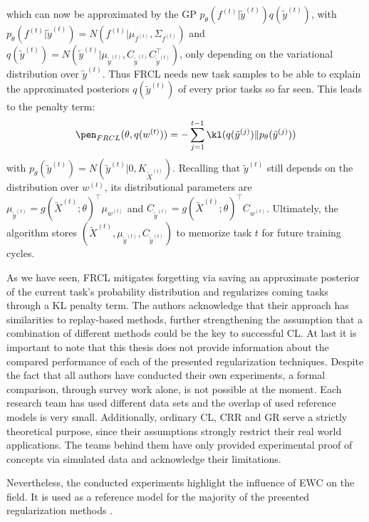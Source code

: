which can now be approximated by the GP $p_\theta(f^{(t)}| \tilde{y}^{(t)})q(\tilde{y}^{(t)})$, with $p_\theta(f^{(t)}|\tilde{y}^{(t)}) = N(f^{(t)}|\mu_{f^{(t)}},\allowbreak \Sigma_{f^{(t)}})$ and $q(\tilde{y}^{(t)}) = N(\tilde{y}^{(t)}|\mu_{\tilde{y}^{(t)}}, C_{\tilde{y}^{(t)}}C_{\tilde{y}^{(t)}}^\top)$, only depending on the variational distribution over $\tilde{y}^{(t)}$. Thus FRCL needs new task samples to be able to explain the approximated posteriors $q(\tilde{y}^{(t)})$ of every prior tasks so far seen. This leads to the penalty term:
\begin{equation}\label{penElbo}
	\pen_{FRCL}(\theta, q(w^{(t)})) = - \sum_{j=1}^{t-1}\kl(q(\tilde{y}^{(j)})\Vert p_\theta(\tilde{y}^{(j)}))
\end{equation}
with $p_\theta(\tilde{y}^{(t)}) = N(\tilde{y}^{(t)}|0, K_{\tilde{X}^{(t)}})$. Recalling that $\tilde{y}^{(t)}$ still depends on the distribution over $w^{(t)}$, its distributional parameters are $\mu_{\tilde{y}^{(t)}} = g(\tilde{X}^{(t)}; \theta)^\top \mu_{w^{(t)}}$ and $C_{\tilde{y}^{(t)}} = g(\tilde{X}^{(t)}; \theta)^\top C_{w^{(t)}}$. Ultimately, the algorithm stores $(\tilde{X}^{(t)}, \mu_{\tilde{y}^{(t)}}, C_{\tilde{y}^{(t)}})$ to memorize task $t$ for future training cycles.

As we have seen, FRCL mitigates forgetting via saving an approximate posterior of the current task's probability distribution and regularizes coming tasks through a KL penalty term. The authors acknowledge that their approach has similarities to replay-based methods, further strengthening the assumption that a combination of different methods could be the key to successful CL.
At last it is important to note that this thesis does not provide information about the compared performance of each of the presented regularization techniques. Despite the fact that all authors have conducted their own experiments, a formal comparison, through survey work alone, is not possible at the moment. Each research team has used different data sets and the overlap of used reference models is very small. Additionally, ordinary CL, CRR and GR serve a strictly theoretical purpose, since their assumptions strongly restrict their real world applications. The teams behind them have only provided experimental proof of concepts via simulated data and acknowledge their limitations.

Nevertheless, the conducted experiments highlight the influence of EWC on the field. It is used as a reference model for the majority of the presented regularization methods \cite{zenke2017continuallearningsynapticintelligence, aljundi2018memoryawaresynapseslearning, yoon2018lifelonglearningdynamicallyexpandable, jung2021continuallearningnodeimportancebased, titsias2020functionalregularisationcontinuallearning}.


